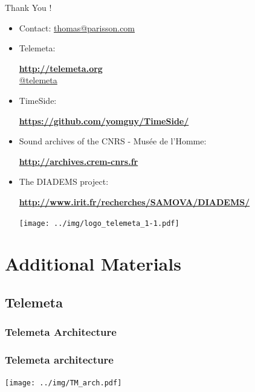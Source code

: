 \documentclass[final, hyperref, table]{beamer}
\begin{document}
\begin{frame}{Thank You !}\\
  \begin{itemize}
  \item Contact: \url{thomas@parisson.com}
  \item Telemeta:
    \begin{center}
      \colorbox{yellow!40}{\textbf{\url{http://telemeta.org}}}\\
      \colorbox{yellow!40}{\href{https://twitter.com/telemeta/}{@telemeta}}
    \end{center}

  \item TimeSide:
    \begin{center}
      \colorbox{yellow!40}{\bf
        \url{https://github.com/yomguy/TimeSide/}}
    \end{center}

  \item Sound archives of the CNRS - Musée de l’Homme:
    \begin{center}
      \colorbox{yellow!40}{\bf\url{http://archives.crem-cnrs.fr}}
    \end{center}

  \item The DIADEMS project:
    \begin{center}
      \colorbox{yellow!40}{\bf
        \url{http://www.irit.fr/recherches/SAMOVA/DIADEMS/}}
    \end{center}

    \begin{center}
    \texttt{[image: ../img/logo\_telemeta\_1-1.pdf]}
    \end{center}
  \end{itemize}

\end{frame}

\appendix
\section{Additional Materials}
\subsection{Telemeta}
\subsubsection{Telemeta Architecture}
\begin{frame}\frametitle{Telemeta architecture}
  \begin{center}
    \texttt{[image: ../img/TM\_arch.pdf]}
  \end{center}
\end{frame}
\end{document}
